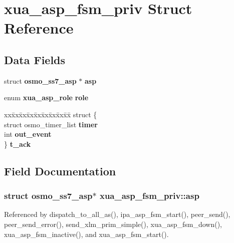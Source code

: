 \section{xua\+\_\+asp\+\_\+fsm\+\_\+priv Struct Reference}
\label{structxua__asp__fsm__priv}
\subsection*{Data Fields}
\begin{DoxyCompactItemize}
\item 
struct {\bf osmo\+\_\+ss7\+\_\+asp} $\ast$ {\bf asp}
\item 
enum {\bf xua\+\_\+asp\+\_\+role} {\bf role}
\item 
\begin{tabbing}
xx\=xx\=xx\=xx\=xx\=xx\=xx\=xx\=xx\=\kill
struct \{\\
\>struct osmo\_timer\_list {\bf timer}\\
\>int {\bf out\_event}\\
\} {\bf t\_ack}\\

\end{tabbing}\end{DoxyCompactItemize}


\subsection{Field Documentation}
\subsubsection[{asp}]{\setlength{\rightskip}{0pt plus 5cm}struct {\bf osmo\+\_\+ss7\+\_\+asp}$\ast$ xua\+\_\+asp\+\_\+fsm\+\_\+priv\+::asp}\label{structxua__asp__fsm__priv_acb09d4b6fbae3d17166650d6b4b50d59}


Referenced by dispatch\+\_\+to\+\_\+all\+\_\+as(), ipa\+\_\+asp\+\_\+fsm\+\_\+start(), peer\+\_\+send(), peer\+\_\+send\+\_\+error(), send\+\_\+xlm\+\_\+prim\+\_\+simple(), xua\+\_\+asp\+\_\+fsm\+\_\+down(), xua\+\_\+asp\+\_\+fsm\+\_\+inactive(), and xua\+\_\+asp\+\_\+fsm\+\_\+start().

